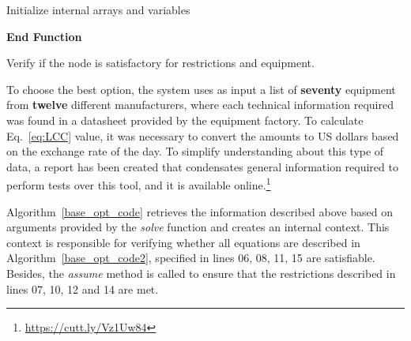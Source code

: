 \documentclass[journal]{IEEEtran}
\begin{document}
\begin{algorithm}[ht]
\SetAlgoLined
{}
 Initialize internal arrays and variables\;
 
\textbf{End Function}\;
\caption{Verify if the node is satisfactory for restrictions and equipment.}
\label{base_opt_code2}
\end{algorithm}

To choose the best option, the system uses as input a list of \textbf{seventy} equipment from \textbf{twelve} 
different manufacturers, where each technical information required was found in a datasheet provided by the equipment factory. To calculate Eq.~\eqref{eq:LCC} value,
it was necessary to convert the amounts to US dollars based on the exchange rate of the day. To simplify understanding about this type of data, a report has been created that condensates general information required to perform tests over this tool, and it is available online.\footnote{\label{note1}\href{https://cutt.ly/Vz1Uw84}{https://cutt.ly/Vz1Uw84}}

Algorithm~\ref{base_opt_code} retrieves the information described above based on arguments provided by the \textit{solve} function and creates an internal context. This context is responsible for verifying whether all equations are described in Algorithm~\ref{base_opt_code2}, specified in lines 06, 08, 11, 15 are satisfiable. Besides, the \textit{assume} method is called to ensure that the restrictions described in lines 07, 10, 12 and 14 are met.
\end{document}
